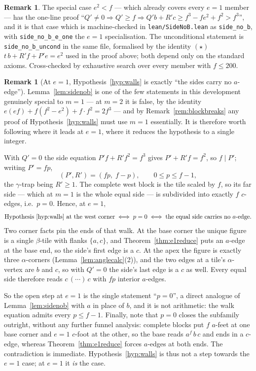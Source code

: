 \documentclass[11pt,reqno]{amsart}
\theoremstyle{plain}
\theoremstyle{definition}
\newtheorem{remark}[theorem]{Remark}
\begin{document}
\begin{remark}
The special case $e^2<f$ --- which already covers every $e=1$ member --- has the one-line proof
``$Q'\ne0\Rightarrow Q'\ge f\Rightarrow Q'b+R'c\ge f^3-fe^2+f^2>f^3$'', and it is that case which is
machine-checked in \texttt{lean/SideNoB.lean} as \texttt{side\_no\_b}, with
\texttt{side\_no\_b\_e\_one} the $e=1$ specialisation. The unconditional statement is
\texttt{side\_no\_b\_uncond} in the same file, formalised by the identity $(\star)$
$t\,b+R'f+P'e=e^2$ used in the proof above; both depend only on the standard axioms. Cross-checked
by exhaustive search over every member with $f\le200$.
\end{remark}

\begin{remark}[At $e=1$, Hypothesis~\ref{hyp:walls} is exactly ``the sides carry no $a$-edge'']\label{rem:sidenoa}
Lemma~\ref{lem:sidenob} is one of the few statements in this development genuinely special to $m=1$
--- at $m=2$ it is false, by the identity $e(ef)+f(f^2-e^2)+f\cdot f^2=2f^3$ --- and by
Remark~\ref{rem:blockbreaks} any proof of Hypothesis~\ref{hyp:walls} must use $m=1$ essentially.
It is therefore worth following where it leads at $e=1$, where it reduces the hypothesis to a single
integer.

With $Q'=0$ the side equation $P'f+R'f^2=f^3$ gives $P'+R'f=f^2$, so $f\mid P'$; writing $P'=fp$,
\[
(P',R') = (fp,\; f-p), \qquad 0\le p\le f-1,
\]
the $\gamma$-trap being $R'\ge1$. The complete west block is the tile scaled by $f$, so its far side
--- which at $m=1$ is the whole equal side --- is subdivided into exactly $f$ $c$-edges, i.e.\ $p=0$.
Hence, at $e=1$,
\[
\textup{Hypothesis~\ref{hyp:walls} at the west corner} \iff p=0 \iff
\textup{the equal side carries no } a\textup{-edge}.
\]
Two corner facts pin the ends of that walk. At the base corner the unique figure is a single
$\beta$-tile with flanks $\{a,c\}$, and Theorem~\ref{thm:e1reduce} puts an $a$-edge at the base end,
so the side's first edge is a $c$. At the apex the figure is exactly three $\alpha$-corners
(Lemma~\ref{lem:anglecalc}(2)), and the two edges at a tile's $\alpha$-vertex are $b$ and $c$, so
with $Q'=0$ the side's last edge is a $c$ as well. Every equal side therefore reads
$c\,(\cdots)\,c$ with $fp$ interior $a$-edges.

So the open step at $e=1$ is the single statement ``$p=0$'', a direct analogue of
Lemma~\ref{lem:sidenob} with $a$ in place of $b$, and it is not arithmetic: the walk equation admits
every $p\le f-1$. Finally, note that $p=0$ closes the subfamily outright, without any further
funnel analysis: complete blocks put $f$ $a$-feet at one base corner and $e=1$ $c$-foot at the
other, so the base reads $a^f\,b\,c$ and ends in a $c$-edge, whereas Theorem~\ref{thm:e1reduce}
forces $a$-edges at both ends. The contradiction is immediate. Hypothesis~\ref{hyp:walls} is thus not
a step towards the $e=1$ case; at $e=1$ it \emph{is} the case.
\end{remark}
\end{document}
